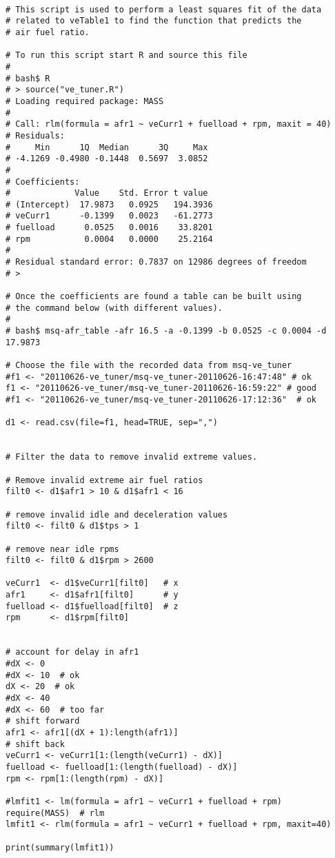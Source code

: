 
\begin{verbatim}

# This script is used to perform a least squares fit of the data
# related to veTable1 to find the function that predicts the
# air fuel ratio.

# To run this script start R and source this file
#
# bash$ R
# > source("ve_tuner.R")
# Loading required package: MASS
# 
# Call: rlm(formula = afr1 ~ veCurr1 + fuelload + rpm, maxit = 40)
# Residuals:
#     Min      1Q  Median      3Q     Max 
# -4.1269 -0.4980 -0.1448  0.5697  3.0852 
# 
# Coefficients:
#             Value    Std. Error t value 
# (Intercept)  17.9873   0.0925   194.3936
# veCurr1      -0.1399   0.0023   -61.2773
# fuelload      0.0525   0.0016    33.8201
# rpm           0.0004   0.0000    25.2164
# 
# Residual standard error: 0.7837 on 12986 degrees of freedom
# >

# Once the coefficients are found a table can be built using
# the command below (with different values).
#
# bash$ msq-afr_table -afr 16.5 -a -0.1399 -b 0.0525 -c 0.0004 -d 17.9873

# Choose the file with the recorded data from msq-ve_tuner
#f1 <- "20110626-ve_tuner/msq-ve_tuner-20110626-16:47:48" # ok
f1 <- "20110626-ve_tuner/msq-ve_tuner-20110626-16:59:22" # good
#f1 <- "20110626-ve_tuner/msq-ve_tuner-20110626-17:12:36"  # ok

d1 <- read.csv(file=f1, head=TRUE, sep=",")


# Filter the data to remove invalid extreme values.

# Remove invalid extreme air fuel ratios
filt0 <- d1$afr1 > 10 & d1$afr1 < 16

# remove invalid idle and deceleration values
filt0 <- filt0 & d1$tps > 1

# remove near idle rpms
filt0 <- filt0 & d1$rpm > 2600

veCurr1  <- d1$veCurr1[filt0]  	# x
afr1 	 <- d1$afr1[filt0]  	# y
fuelload <- d1$fuelload[filt0]  # z
rpm 	 <- d1$rpm[filt0]


# account for delay in afr1
#dX <- 0
#dX <- 10  # ok
dX <- 20  # ok
#dX <- 40
#dX <- 60  # too far
# shift forward
afr1 <- afr1[(dX + 1):length(afr1)]
# shift back
veCurr1 <- veCurr1[1:(length(veCurr1) - dX)]
fuelload <- fuelload[1:(length(fuelload) - dX)]
rpm <- rpm[1:(length(rpm) - dX)]

#lmfit1 <- lm(formula = afr1 ~ veCurr1 + fuelload + rpm)
require(MASS)  # rlm
lmfit1 <- rlm(formula = afr1 ~ veCurr1 + fuelload + rpm, maxit=40)

print(summary(lmfit1))


\end{verbatim}
